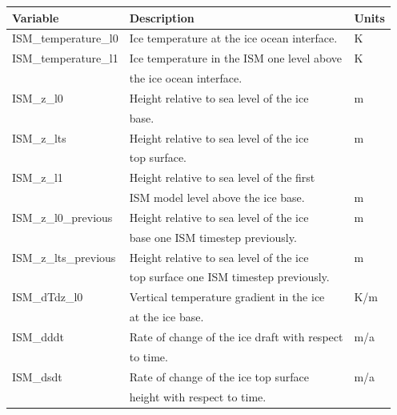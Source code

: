 \documentclass[12pt]{article}
\begin{document}
\begin{table}
  \begin{center}
    \begin{tabular}{ l|l|l }
      Variable              & Description                                  & Units \\
      \hline
      ISM\_temperature\_l0  & Ice temperature at the ice ocean interface.  & K \\
      ISM\_temperature\_l1  & Ice temperature in the ISM one level above   & K \\
                            & the ice ocean interface.                     &   \\ 
      ISM\_z\_l0            & Height relative to sea level of the ice      & m \\
                            & base.                                        &   \\
      ISM\_z\_lts           & Height relative to sea level of the ice      & m \\
                            & top surface.                                 &   \\
      ISM\_z\_l1            & Height relative to sea level of the first    &   \\
                            & ISM model level above the ice base.          & m \\
      ISM\_z\_l0\_previous  & Height relative to sea level of the ice      & m \\
                            & base one ISM timestep previously.            &   \\
      ISM\_z\_lts\_previous & Height relative to sea level of the ice      & m \\
                            & top surface one ISM timestep previously.     &   \\
      ISM\_dTdz\_l0         & Vertical temperature gradient in the ice     & K/m \\
                            & at the ice base.                             &   \\
      ISM\_dddt             & Rate of change of the ice draft with respect & m/a \\
                            & to time.                                     &   \\
      ISM\_dsdt             & Rate of change of the ice top surface        & m/a \\
                            & height with respect to time.                 &   \\

\end{tabular}
\end{center}
\end{table}
\end{document}

